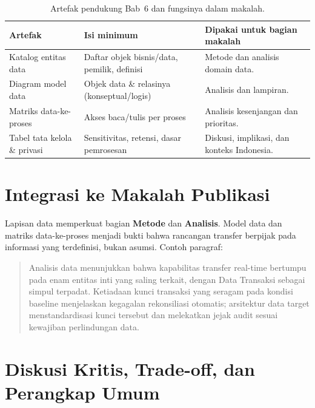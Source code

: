 \begin{table}[htbp]
\centering
\scriptsize
\caption{Artefak pendukung Bab~6 dan fungsinya dalam makalah.}
\label{tab:artefak-bab5-data}
\begin{tabularx}{\textwidth}{@{}p{} p{} X@{}}
\hline
\textbf{Artefak} & \textbf{Isi minimum} & \textbf{Dipakai untuk bagian makalah} \\
\hline
Katalog entitas data & Daftar objek bisnis/data, pemilik, definisi & Metode dan
analisis domain data. \\
Diagram model data & Objek data \& relasinya (konseptual/logis) & Analisis dan
lampiran. \\
Matriks data-ke-proses & Akses baca/tulis per proses & Analisis kesenjangan dan
prioritas. \\
Tabel tata kelola \& privasi & Sensitivitas, retensi, dasar pemrosesan & Diskusi,
implikasi, dan konteks Indonesia. \\
\hline
\end{tabularx}
\end{table}

\section{Integrasi ke Makalah Publikasi}

Lapisan data memperkuat bagian \textbf{Metode} dan \textbf{Analisis}. Model data
dan matriks data-ke-proses menjadi bukti bahwa rancangan transfer berpijak pada
informasi yang terdefinisi, bukan asumsi. Contoh paragraf:

\begin{quote}
Analisis data menunjukkan bahwa kapabilitas transfer real-time bertumpu pada enam
entitas inti yang saling terkait, dengan Data Transaksi sebagai simpul terpadat.
Ketiadaan kunci transaksi yang seragam pada kondisi baseline menjelaskan
kegagalan rekonsiliasi otomatis; arsitektur data target menstandardisasi kunci
tersebut dan melekatkan jejak audit sesuai kewajiban perlindungan data.
\end{quote}

\section{Diskusi Kritis, Trade-off, dan Perangkap Umum}

